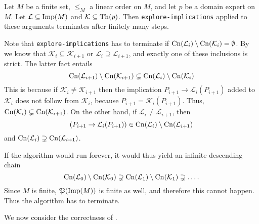 \begin{Theorem}
  \label{thm:explore-implications-termination}
  Let $M$ be a finite set, $\leq_M$ a linear order on $M$, and let $p$ be a domain expert on
  $M$. Let $\mathcal{L} \subseteq \operatorname{Imp}(M)$ and $\mathcal{K} \subseteq \operatorname{Th}(p)$.  Then
  \lstinline{explore-implications} applied to these arguments terminates after finitely
  many steps.
\end{Theorem}
\begin{Proof}
  Note that \lstinline{explore-implications} has to terminate if $\operatorname{Cn}(\mathcal{L}_i)
  \setminus \operatorname{Cn}(\mathcal{K}_i) = \emptyset$.  By
   we know that $\mathcal{K}_i
  \subseteq \mathcal{K}_{i+1}$ or $\mathcal{L}_i \supseteq \mathcal{L}_{i+1}$, and exactly
  one of these inclusions is strict.  The latter fact entails
  \begin{equation}
    \label{eq:36}
    \operatorname{Cn}(\mathcal{L}_{i+1}) \setminus \operatorname{Cn}(\mathcal{K}_{i+1}) \subsetneq \operatorname{Cn}(\mathcal{L}_i)
    \setminus \operatorname{Cn}(\mathcal{K}_i)
  \end{equation}
  This is because if $\mathcal{K}_i \neq \mathcal{K}_{i+1}$ then the implication $P_{i+1}
  \to \mathcal{L}_i(P_{i+1})$ added to $\mathcal{K}_{i}$ does not follow from
  $\mathcal{K}_i$, because $P_{i+1} = \mathcal{K}_{i}(P_{i+1})$.  Thus,
  $\operatorname{Cn}(\mathcal{K}_i) \subsetneq \operatorname{Cn}(\mathcal{K}_{i+1})$.  On the other hand, if
  $\mathcal{L}_i \neq \mathcal{L}_{i+1}$, then
  \begin{equation*}
    (P_{i+1} \to \mathcal{L}_i(P_{i+1})) \in \operatorname{Cn}(\mathcal{L}_i) \setminus \operatorname{Cn}(\mathcal{L}_{i+1})
  \end{equation*}
  and $\operatorname{Cn}(\mathcal{L}_i) \supsetneq \operatorname{Cn}(\mathcal{L}_{i+1})$.

  If the algorithm would run forever, it would thus yield an infinite descending chain
  \begin{equation*}
    \operatorname{Cn}(\mathcal{L}_0) \setminus \operatorname{Cn}(\mathcal{K}_0) \supsetneq \operatorname{Cn}(\mathcal{L}_1)
    \setminus \operatorname{Cn}(\mathcal{K}_1) \supsetneq \dots.
  \end{equation*}
  Since $M$ is finite, ${\mathfrak{P}(\operatorname{Imp}(M))}$ is finite as well, and therefore this cannot
  happen.  Thus the algorithm has to terminate.
\end{Proof}

We now consider the correctness of .

